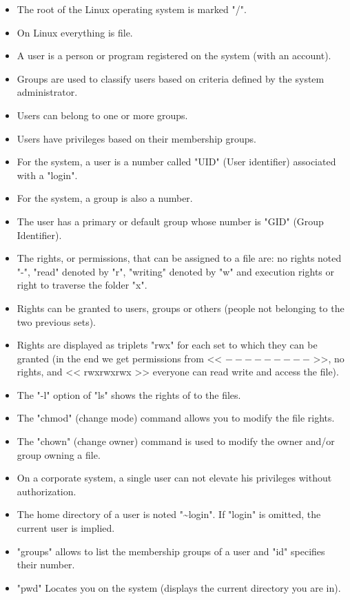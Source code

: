 \documentclass[11pt]{article}
\begin{document}
\begin{itemize}
	\item The root of the Linux operating system is marked "/".
	\item On Linux everything is file.
	\item A user is a person or program registered on the system (with an account).
	\item Groups are used to classify users based on criteria defined by the system administrator.
	\item Users can belong to one or more groups.
	\item Users have privileges based on their membership groups.
	\item For the system, a user is a number called "UID" (User identifier) associated with a "login".
	\item For the system, a group is also a number.
	\item The user has a primary or default group whose number is "GID" (Group Identifier).
	\item The rights, or permissions, that can be assigned to a file are: no rights noted "-", "read" denoted by "r", "writing" denoted by "w" and execution rights or right to traverse the folder "x".
	\item Rights can be granted to users, groups or others (people not belonging to the two previous sets).
	\item Rights are displayed as triplets "rwx" for each set to which they can be granted (in the end we get permissions from << $ --------- $ >>, no rights, and << rwxrwxrwx >> everyone can read write and access the file).
	\item The "-l" option of "ls" shows the rights of to the files.
	\item The "chmod" (change mode) command allows you to modify the file rights.
	\item The "chown" (change owner) command is used to modify the owner and/or group owning a file.
	\item On a corporate system, a single user can not elevate his privileges without authorization.
	\item The home directory of a user is noted "\textasciitilde{}login". If "login" is omitted, the current user is implied.
	\item "groups" allows to list the membership groups of a user and "id" specifies their number.
	\item "pwd" Locates you on the system (displays the current directory you are in).
\end{itemize}
\end{document}
